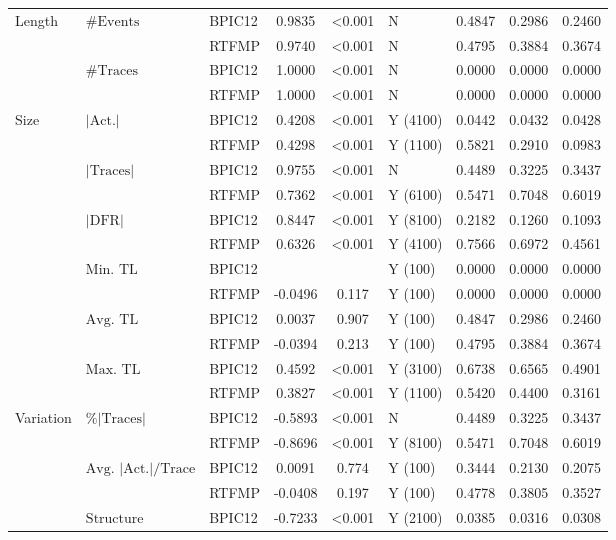 \begin{longtable}{lllcclccc}
\bottomrule
\endfoot
Length & $\#\text{Events}$ & BPIC12 & 0.9835 & <0.001 & N & 0.4847 & 0.2986 & 0.2460 \\
 &  & RTFMP & 0.9740 & <0.001 & N & 0.4795 & 0.3884 & 0.3674 \\
\cmidrule(lr){2-9}
 & $\#\text{Traces}$ & BPIC12 & 1.0000 & <0.001 & N & 0.0000 & 0.0000 & 0.0000 \\
 &  & RTFMP & 1.0000 & <0.001 & N & 0.0000 & 0.0000 & 0.0000 \\
\cmidrule(lr){1-9}
Size & $|\text{Act.}|$ & BPIC12 & 0.4208 & <0.001 & Y (4100) & 0.0442 & 0.0432 & 0.0428 \\
 &  & RTFMP & 0.4298 & <0.001 & Y (1100) & 0.5821 & 0.2910 & 0.0983 \\
\cmidrule(lr){2-9}
 & $|\text{Traces}|$ & BPIC12 & 0.9755 & <0.001 & N & 0.4489 & 0.3225 & 0.3437 \\
 &  & RTFMP & 0.7362 & <0.001 & Y (6100) & 0.5471 & 0.7048 & 0.6019 \\
\cmidrule(lr){2-9}
 & $|\text{DFR}|$ & BPIC12 & 0.8447 & <0.001 & Y (8100) & 0.2182 & 0.1260 & 0.1093 \\
 &  & RTFMP & 0.6326 & <0.001 & Y (4100) & 0.7566 & 0.6972 & 0.4561 \\
\cmidrule(lr){2-9}
 & $\text{Min. TL}$ & BPIC12 &  &  & Y (100) & 0.0000 & 0.0000 & 0.0000 \\
 &  & RTFMP & -0.0496 & 0.117 & Y (100) & 0.0000 & 0.0000 & 0.0000 \\
\cmidrule(lr){2-9}
 & $\text{Avg. TL}$ & BPIC12 & 0.0037 & 0.907 & Y (100) & 0.4847 & 0.2986 & 0.2460 \\
 &  & RTFMP & -0.0394 & 0.213 & Y (100) & 0.4795 & 0.3884 & 0.3674 \\
\cmidrule(lr){2-9}
 & $\text{Max. TL}$ & BPIC12 & 0.4592 & <0.001 & Y (3100) & 0.6738 & 0.6565 & 0.4901 \\
 &  & RTFMP & 0.3827 & <0.001 & Y (1100) & 0.5420 & 0.4400 & 0.3161 \\
\cmidrule(lr){1-9}
Variation & $\%|\text{Traces}|$ & BPIC12 & -0.5893 & <0.001 & N & 0.4489 & 0.3225 & 0.3437 \\
 &  & RTFMP & -0.8696 & <0.001 & Y (8100) & 0.5471 & 0.7048 & 0.6019 \\
\cmidrule(lr){2-9}
 & $\text{Avg.\ } | \text{Act.}| /\text{Trace}$ & BPIC12 & 0.0091 & 0.774 & Y (100) & 0.3444 & 0.2130 & 0.2075 \\
 &  & RTFMP & -0.0408 & 0.197 & Y (100) & 0.4778 & 0.3805 & 0.3527 \\
\cmidrule(lr){2-9}
 & $\text{Structure}$ & BPIC12 & -0.7233 & <0.001 & Y (2100) & 0.0385 & 0.0316 & 0.0308 \\

\end{longtable}
